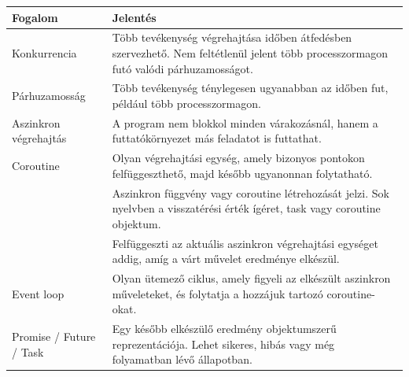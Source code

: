\begin{tabularx}{\textwidth}{L{31mm}X}
\toprule
\textbf{Fogalom} & \textbf{Jelentés} \\
\midrule
Konkurrencia & Több tevékenység végrehajtása időben átfedésben szervezhető. Nem feltétlenül jelent több processzormagon futó valódi párhuzamosságot. \\
Párhuzamosság & Több tevékenység ténylegesen ugyanabban az időben fut, például több processzormagon. \\
Aszinkron végrehajtás & A program nem blokkol minden várakozásnál, hanem a futtatókörnyezet más feladatot is futtathat. \\
Coroutine & Olyan végrehajtási egység, amely bizonyos pontokon felfüggeszthető, majd később ugyanonnan folytatható. \\
 & Aszinkron függvény vagy coroutine létrehozását jelzi. Sok nyelvben a visszatérési érték ígéret, task vagy coroutine objektum. \\
 & Felfüggeszti az aktuális aszinkron végrehajtási egységet addig, amíg a várt művelet eredménye elkészül. \\
Event loop & Olyan ütemező ciklus, amely figyeli az elkészült aszinkron műveleteket, és folytatja a hozzájuk tartozó coroutine-okat. \\
Promise / Future / Task & Egy később elkészülő eredmény objektumszerű reprezentációja. Lehet sikeres, hibás vagy még folyamatban lévő állapotban. \\
\bottomrule
\end{tabularx}
